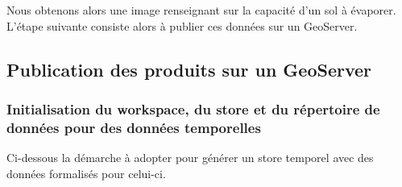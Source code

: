 \documentclass[10pt,a4paper]{article}
\begin{document}
Nous obtenons alors une image renseignant sur la capacité d'un sol à évaporer. L'étape suivante consiste alors à publier ces données sur un GeoServer.

\subsection{Publication des produits sur un GeoServer}

\subsubsection{Initialisation du workspace, du store et du répertoire de données pour des données temporelles}

Ci-dessous la démarche à adopter pour générer un store temporel avec des données formalisés pour celui-ci.
\end{document}
